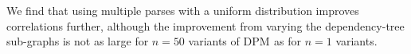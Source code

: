 \documentclass[11pt]{article}
\newcommand{\DPM}[1]{\ensuremath{\mathrm{DPM}_{#1}}}
\newcommand{\BoNG}[1]{\ensuremath{\textrm{bag-of-ngrams}(#1)}}
\begin{document}
We find that using multiple parses with a uniform distribution
improves correlations further, although the improvement from varying
the dependency-tree sub-graphs is not as large for $n=50$ variants of
\DPM{} as for $n=1$ variants.

\end{document}
